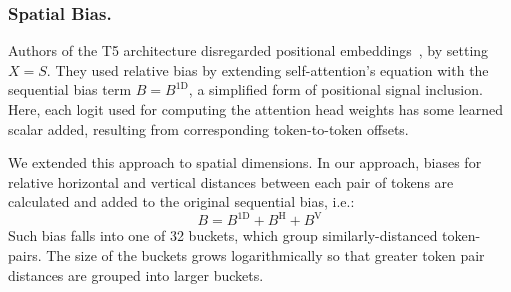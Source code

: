 \documentclass[runningheads]{llncs}
\begin{document}



\subsubsection{Spatial Bias.}\label{layout_emb}
Authors of the T5 architecture disregarded positional embeddings~\cite{2020t5}, by setting $X = S$. They used relative bias by extending self-attention's equation with the sequential bias term $B = B^{\text{1D}}$, a simplified form of positional signal inclusion. Here, each logit used for computing the attention head weights has some learned scalar added, resulting from corresponding token-to-token offsets.

We extended this approach to spatial dimensions. In our approach, biases for relative horizontal and vertical distances between each pair of tokens are calculated and added to the original sequential bias, i.e.: $$B = B^{\text{1D}} + B^{\text{H}} + B^{\text{V}}$$ Such bias falls into one of 32 buckets, which group similarly-distanced token-pairs.
The size of the buckets grows logarithmically so that greater token pair distances are grouped into larger buckets.

\end{document}
